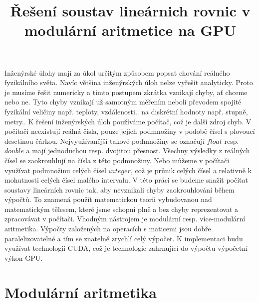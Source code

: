 \documentclass[thesis=M,czech]{FITthesis}[2012/06/26]
\title{Řešení soustav lineárnich rovnic v modulární aritmetice na GPU}
\begin{document}

\begin{introduction}
Inženýrské úlohy mají za úkol určitým způsobem popsat chování reálného fyzikálního světa. Navíc většina inženýrských úloh nelze vyřešit analyticky. Proto je musíme řešit numericky a tímto postupem zkrátka vznikají chyby, ať chceme nebo ne. Tyto chyby vznikají už samotným měřením neboli převodem spojité fyzikální veličiny např. teploty, vzdálenosti.. na diskrétní hodnoty např. stupně, metry.. K řešení inženýrských úloh používáme počítač, což je další zdroj chyb. V počítači neexistují reálná čísla, pouze jejich podmnožiny v podobě čísel s plovoucí desetinou čárkou. Nejvyužívanější takové podmnožiny se označují $float$ resp. $double$ a mají jednoduchou resp. dvojitou přesnost.  Všechny výsledky z reálných čísel se zaokrouhlují na čísla z této podmnožiny.
Nebo můžeme v počítači využívat podmnožinu celých čísel $integer$, což je průnik celých čísel a relativně k mohutnosti celých čísel malého intervalu.
V této práci se budeme snažit počítat soustavy lineárních rovnic tak, aby nevznikali chyby zaokrouhlování během výpočtů. To znamená použít matematickou teorii vybudovanou nad matematickým tělesem, které jsme schopni plně a bez chyby reprezentovat a zpracovávat v počítači. Vhodným nástrojem je modulární resp. více-modulární aritmetika.
Výpočty založených na operacích s maticemi jsou dobře paralelizovatelné a tím se znatelně zrychlí celý výpočet.
K implementaci budu využívat technologii CUDA, což je technologie zahrnující do výpočtu výpočetní výkon GPU.
\end{introduction}

\chapter{Modulární aritmetika}
\end{document}
